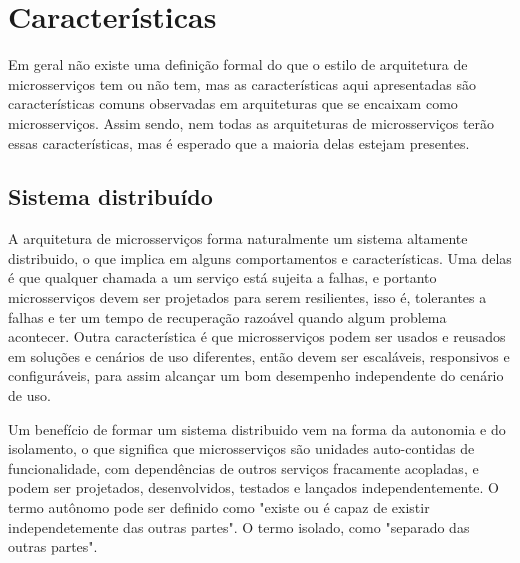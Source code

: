 \chapter{Características}\label{chapter-caracteristicas}



Em geral não existe uma definição formal do que o estilo de arquitetura de microsserviços tem ou não tem, mas as características aqui apresentadas são características comuns observadas em arquiteturas que se encaixam como microsserviços. Assim sendo, nem todas as arquiteturas de microsserviços terão essas características, mas é esperado que a maioria delas estejam presentes. \cite{MartinFowlerMicroservices}

\section{Sistema distribuído}
A arquitetura de microsserviços forma naturalmente um sistema altamente distribuido, o que implica em alguns comportamentos e características. Uma delas é que qualquer chamada a um serviço está sujeita a falhas, e portanto microsserviços devem ser projetados para serem resilientes, isso é, tolerantes a falhas e ter um tempo de recuperação razoável quando algum problema acontecer. Outra característica é que microsserviços podem ser usados e reusados em soluções e cenários de uso diferentes, então devem ser escaláveis, responsivos e configuráveis, para assim alcançar um bom desempenho independente do cenário de uso. \cite{MartinFowlerMicroservices,Familiar2015}

Um benefício de formar um sistema distribuido vem na forma da autonomia e do isolamento, o que significa que microsserviços são unidades auto-contidas de funcionalidade, com dependências de outros serviços fracamente acopladas, e podem ser projetados, desenvolvidos, testados e lançados independentemente. O termo autônomo pode ser definido como "existe ou é capaz de existir independetemente das outras partes". O termo isolado, como "separado das outras partes". \cite{Familiar2015}

